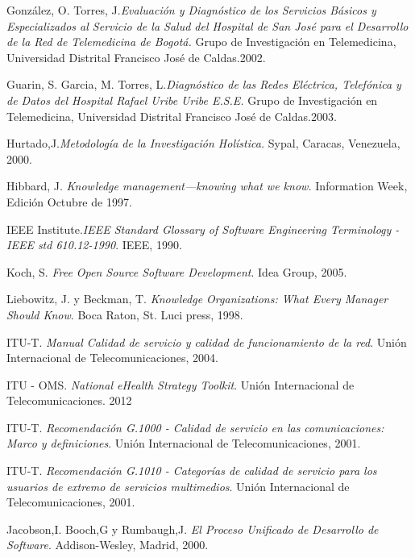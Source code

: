 \begin{thebibliography}{}
 González, O. Torres, J.\textit{Evaluación y Diagnóstico de los Servicios Básicos y Especializados al Servicio de la Salud del Hospital de San José para el Desarrollo de la Red de Telemedicina de Bogotá.} Grupo de Investigación en Telemedicina, Universidad Distrital Francisco José de Caldas.2002.

 Guarin, S. Garcia, M. Torres, L.\textit{Diagnóstico de las Redes Eléctrica, Telefónica y de Datos del Hospital Rafael Uribe Uribe E.S.E.} Grupo de Investigación en Telemedicina,  Universidad Distrital Francisco José de Caldas.2003.

 Hurtado,J.\textit{Metodología de la Investigación Holística.} Sypal, Caracas, Venezuela, 2000.

 Hibbard, J. \textit{Knowledge management—knowing what we know.} Information Week, Edición Octubre de 1997.

 IEEE Institute.\textit{IEEE Standard Glossary of Software Engineering Terminology - IEEE std 610.12-1990}. IEEE, 1990.

 Koch, S. \textit{Free Open Source Software Development}. Idea Group, 2005.

 Liebowitz, J. y Beckman, T. \textit{Knowledge Organizations: What Every Manager Should Know}. Boca Raton, St. Luci press, 1998.

 ITU-T. \textit{Manual Calidad de servicio y calidad de funcionamiento de la red}. Unión Internacional de Telecomunicaciones, 2004.

 ITU - OMS. \textit{National eHealth Strategy Toolkit}. Unión Internacional de Telecomunicaciones. 2012 

 ITU-T. \textit{Recomendación G.1000 - Calidad de servicio en las comunicaciones: Marco y definiciones}. Unión Internacional de Telecomunicaciones, 2001.

 ITU-T. \textit{Recomendación G.1010 - Categorías de calidad de servicio para los usuarios de extremo de servicios multimedios}. Unión Internacional de Telecomunicaciones, 2001.

 Jacobson,I. Booch,G y Rumbaugh,J. \textit{El Proceso Unificado de Desarrollo de Software}. Addison-Wesley, Madrid, 2000.


\end{thebibliography}
